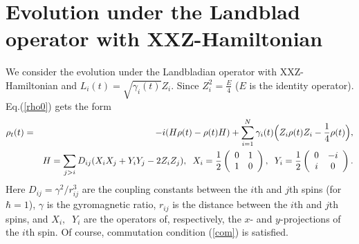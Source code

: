 \documentclass[pra,preprint,showpacs]{revtex4-1}
\begin{document}
\section{Evolution under the Landblad operator with XXZ-Hamiltonian}
\label{Section:ev}
We consider the evolution under the  Landbladian operator with XXZ-Hamiltonian and
$L_i(t) = \sqrt{\gamma_i(t)} Z_{i}$. Since $Z_{i}^2=\frac{E}{4}$ ($E$ is the identity operator). Eq.(\ref{rho0}) gets the form
 \begin{eqnarray}\label{rho}
 \rho_t(t)&=&-i (H  \rho(t) - \rho(t) H)+ \sum_{i=1}^N \gamma_i(t)\Big(Z_{i} \rho(t) Z_{i}
-\frac{1}{4} \rho(t) \Big),
\\\nonumber
&&H=\sum_{j>i} D_{ij} (X_{i}X_{j}+Y_{i}Y_{j}  -2 Z_i Z_j),\;\;
X_i=\frac{1}{2}\left(\begin{array}{cc}
0&1\cr
1&0
\end{array}\right),\;\;  Y_i=\frac{1}{2}\left(\begin{array}{cc}
0&-i\cr
i&0
\end{array}\right) .
\end{eqnarray}
{Here $D_{ij}=\gamma^2/r_{ij}^3$ are the coupling constants between the $i$th and $j$th spins (for $\hbar=1$), $\gamma$ is the gyromagnetic ratio,
$r_{ij}$  is the distance between the $i$th and $j$th spins}, and {$X_i,\;\;Y_i$ are  the operators of, respectively, the $x$- and $y$-projections of the $i$th spin.} Of course, commutation condition (\ref{com}) is satisfied.
\end{document}
